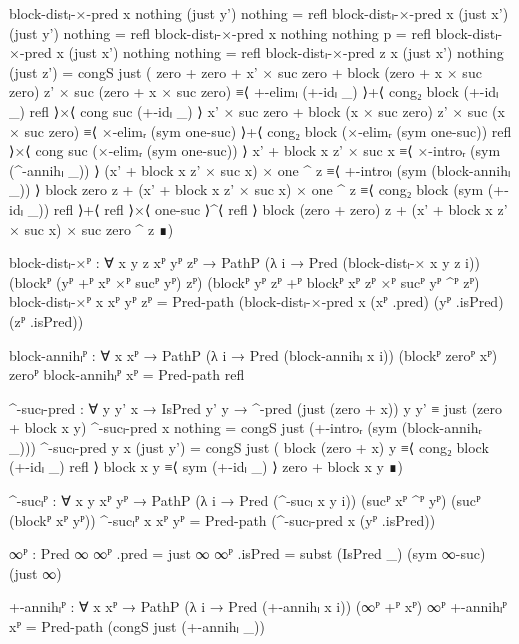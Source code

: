 \begin{code}[hide]
  block-distₗ-×-pred x nothing (just y') nothing = refl
  block-distₗ-×-pred x (just x') (just y') nothing = refl
  block-distₗ-×-pred x nothing nothing p = refl
  block-distₗ-×-pred x (just x') nothing nothing = refl
  block-distₗ-×-pred {z} x (just x') nothing (just z') =
    congS just
      ( zero + zero + x' × suc zero + block (zero + x × suc zero) z' × suc (zero + x × suc zero) ≡⟨ +-elimₗ (+-idₗ _) ⟩+⟨ cong₂ block (+-idₗ _) refl ⟩×⟨ cong suc (+-idₗ _) ⟩
        x' × suc zero + block (x × suc zero) z' × suc (x × suc zero)                             ≡⟨ ×-elimᵣ (sym one-suc) ⟩+⟨ cong₂ block (×-elimᵣ (sym one-suc)) refl ⟩×⟨ cong suc (×-elimᵣ (sym one-suc)) ⟩
        x' + block x z' × suc x                                                                  ≡⟨ ×-introᵣ (sym (^-annihₗ _)) ⟩
        (x' + block x z' × suc x) × one ^ z                                                      ≡⟨ +-introₗ (sym (block-annihₗ _)) ⟩
        block zero z + (x' + block x z' × suc x) × one ^ z                                       ≡⟨ cong₂ block (sym (+-idₗ _)) refl ⟩+⟨ refl ⟩×⟨ one-suc ⟩^⟨ refl ⟩
        block (zero + zero) z + (x' + block x z' × suc x) × suc zero ^ z                         ∎)

  block-distₗ-×ᴾ :
    ∀ {x y z} xᴾ yᴾ zᴾ →
    PathP (λ i → Pred (block-distₗ-× x y z i))
      (blockᴾ (yᴾ +ᴾ xᴾ ×ᴾ sucᴾ yᴾ) zᴾ)
      (blockᴾ yᴾ zᴾ +ᴾ blockᴾ xᴾ zᴾ ×ᴾ sucᴾ yᴾ ^ᴾ zᴾ)
  block-distₗ-×ᴾ {x} xᴾ yᴾ zᴾ =
    Pred-path (block-distₗ-×-pred x (xᴾ .pred) (yᴾ .isPred) (zᴾ .isPred))

  block-annihₗᴾ :
    ∀ {x} xᴾ → PathP (λ i → Pred (block-annihₗ x i)) (blockᴾ zeroᴾ xᴾ) zeroᴾ
  block-annihₗᴾ xᴾ = Pred-path refl

  ^-sucₗ-pred :
    ∀ {y y'} x → IsPred y' y → ^-pred (just (zero + x)) y y' ≡ just (zero + block x y)
  ^-sucₗ-pred x nothing = congS just (+-introᵣ (sym (block-annihᵣ _)))
  ^-sucₗ-pred {y} x (just y') =
    congS just
      ( block (zero + x) y ≡⟨ cong₂ block (+-idₗ _) refl ⟩
        block x y          ≡⟨ sym (+-idₗ _) ⟩
        zero + block x y   ∎)

  ^-sucₗᴾ :
    ∀ {x y} xᴾ yᴾ →
    PathP (λ i → Pred (^-sucₗ x y i)) (sucᴾ xᴾ ^ᴾ yᴾ) (sucᴾ (blockᴾ xᴾ yᴾ))
  ^-sucₗᴾ {x} xᴾ yᴾ = Pred-path (^-sucₗ-pred x (yᴾ .isPred))

  ∞ᴾ : Pred ∞
  ∞ᴾ .pred = just ∞
  ∞ᴾ .isPred = subst (IsPred _) (sym ∞-suc) (just ∞)

  +-annihₗᴾ : ∀ {x} xᴾ → PathP (λ i → Pred (+-annihₗ x i)) (∞ᴾ +ᴾ xᴾ) ∞ᴾ
  +-annihₗᴾ xᴾ = Pred-path (congS just (+-annihₗ _))


\end{code}
